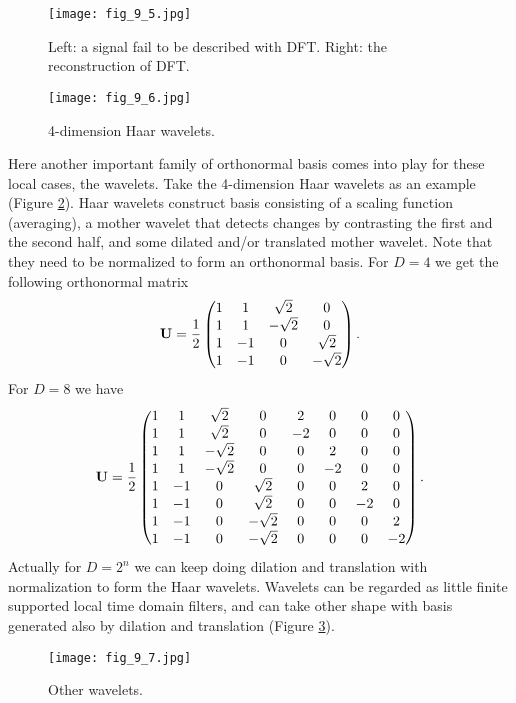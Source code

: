 \documentclass[../book-template.tex]{subfiles}
\begin{document}
\begin{figure}[h] 
	\centering 
	\texttt{[image: fig\_9\_5.jpg]} 
	\caption{Left: a signal fail to be described with DFT. Right: the reconstruction of DFT.}\label{fig_9_5}
\end{figure}
\begin{figure}[h] 
	\centering 
	\texttt{[image: fig\_9\_6.jpg]} 
	\caption{4-dimension Haar wavelets.}\label{fig_9_6}
\end{figure}
\par Here another important family of orthonormal basis comes into play for these local cases, the wavelets. Take the 4-dimension Haar wavelets as an example (Figure \ref{fig_9_6}). Haar wavelets construct basis consisting of a scaling function (averaging), a mother wavelet that detects changes by contrasting the first and the second half, and some dilated and/or translated mother wavelet. Note that they need to be normalized to form an orthonormal basis. For $D=4$ we get the following orthonormal matrix
\begin{equation*}
	{\bf U}=\frac{1}{2}\begin{pmatrix}
	1&1&\sqrt{2}&0\\
	1&1&-\sqrt{2}&0\\
	1&-1&0&\sqrt{2}\\
	1&-1&0&-\sqrt{2}
	\end{pmatrix}.
\end{equation*}
For $D=8$ we have
\begin{equation*}
{\bf U}=\frac{1}{2}\begin{pmatrix}
1&1&\sqrt{2}&0&2&0&0&0\\
1&1&\sqrt{2}&0&-2&0&0&0\\
1&1&-\sqrt{2}&0&0&2&0&0\\
1&1&-\sqrt{2}&0&0&-2&0&0\\
1&-1&0&\sqrt{2}&0&0&2&0\\
1&-1&0&\sqrt{2}&0&0&-2&0\\
1&-1&0&-\sqrt{2}&0&0&0&2\\
1&-1&0&-\sqrt{2}&0&0&0&-2
\end{pmatrix}.
\end{equation*}
Actually for $D=2^n$ we can keep doing dilation and translation with normalization to form the Haar wavelets. Wavelets can be regarded as little finite supported local time domain filters, and can take other shape with basis generated also by dilation and translation (Figure \ref{fig_9_7}).
\begin{figure}[h] 
	\centering 
	\texttt{[image: fig\_9\_7.jpg]} 
	\caption{Other wavelets.}\label{fig_9_7}
\end{figure}
\end{document}
